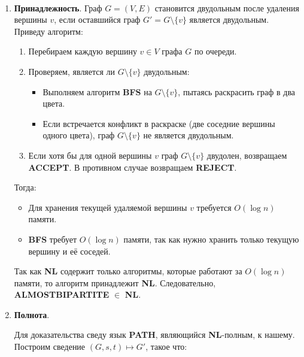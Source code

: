 \begin{solution} ~
    \begin{enumerate}[label=\alph*.]
        \item \textbf{Принадлежность}.
              Граф $G = (V, E)$ становится двудольным после удаления вершины $v$, если оставшийся граф
              $G' = G \setminus \{v\}$ является двудольным. Приведу алгоритм:
              \begin{enumerate}
                  \item Перебираем каждую вершину $v \in V$ графа $G$ по очереди.
                  \item Проверяем, является ли $G \setminus \{v\}$ двудольным:
                        \begin{itemize}
                            \item Выполняем алгоритм \textbf{BFS} на $G \setminus \{v\}$, пытаясь раскрасить граф в два цвета.
                            \item Если встречается конфликт в раскраске (две соседние вершины одного цвета), граф
                                  $G \setminus \{v\}$ не является двудольным.
                        \end{itemize}
                  \item Если хотя бы для одной вершины $v$ граф $G \setminus \{v\}$ двудолен, возвращаем \textbf{ACCEPT}.
                        В противном случае возвращаем \textbf{REJECT}.
              \end{enumerate}

              Тогда:
              \begin{itemize}
                  \item Для хранения текущей удаляемой вершины $v$ требуется $O(\log n)$ памяти.
                  \item \textbf{BFS} требует $O(\log n)$ памяти, так как нужно хранить только текущую вершину и её соседей.
              \end{itemize}

              Так как \textbf{NL} содержит только алгоритмы, которые работают за $O(\log n)$ памяти, то алгоритм принадлежит \textbf{NL}.
              Следовательно, \textbf{ALMOSTBIPARTITE} $\in$ \textbf{NL}.

        \item \textbf{Полнота}.

              Для доказательства сведу язык \textbf{PATH}, являющийся \textbf{NL}-полным, к нашему.
              Построим сведение $(G, s, t) \mapsto G'$, такое что:
              

\end{enumerate}
\end{solution}
